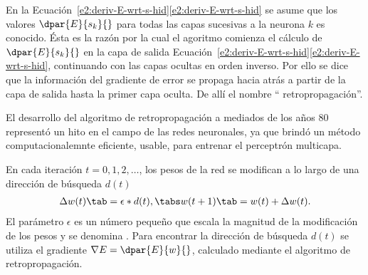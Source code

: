 En la
\iflatexml{}Ecuación~\ref{e2:deriv-E-wrt-s-hid}\else\autoref{e2:deriv-E-wrt-s-hid}\fi
se asume que los valores $\dpar{E}{s_k}{}$ para todas las capas
sucesivas a la neurona $k$ es conocido. Ésta es la razón por la cual
el agoritmo comienza el cálculo de $\dpar{E}{s_k}{}$ en la capa de
salida
\iflatexml{}Ecuación~\ref{e2:deriv-E-wrt-s-hid}\else\autoref{e2:deriv-E-wrt-s-hid}\fi,
continuando con las capas ocultas en orden inverso.
Por ello se dice que la información del gradiente de error se propaga hacia atrás
a partir de la capa de salida hasta la primer capa
oculta. De allí el nombre `` retropropagación''.

El desarrollo del algoritmo de retropropagación a mediados de los años
80 representó un hito en el campo de las redes neuronales, ya
que brindó un método computacionalemnte eficiente, usable, para
entrenar el perceptrón multicapa.

En cada iteración $t=0,1,2,\ldots$, los pesos de la red
se modifican a lo largo de una dirección de búsqueda
$d(t)$ %
%
\begin{align}
  \Delta w(t)\tab=\epsilon * d(t), \tabs w(t+1) \tab= w(t)+\Delta w(t).
\end{align}
%
El parámetro $\epsilon$ es un número pequeño que escala la magnitud de
la modificación de los pesos y se denomina .  Para encontrar la dirección de búsqueda $d(t)$ se
utiliza el gradiente $\nabla{}E=\dpar{E}{w}{}$, calculado mediante el
algoritmo de retropropagación.



